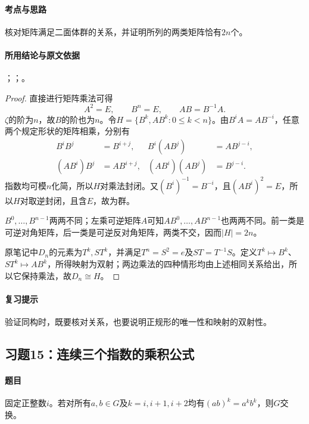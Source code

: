 \paragraph{考点与思路}
核对矩阵满足二面体群的关系，并证明所列的两类矩阵恰有$2n$个。

\paragraph{所用结论与原文依据}
；；。


\begin{proof}
直接进行矩阵乘法可得
\[
A^2=E,\qquad B^n=E,\qquad AB=B^{-1}A.
\]
$\zeta$的阶为$n$，故$B$的阶也为$n$。令$H=\{B^k,AB^k:0\leq k<n\}$。由$B^iA=AB^{-i}$，任意两个规定形状的矩阵相乘，分别有
\begin{align*}
B^iB^j&=B^{i+j},& B^i(AB^j)&=AB^{j-i},\\
(AB^i)B^j&=AB^{i+j},&(AB^i)(AB^j)&=B^{j-i}.
\end{align*}
指数均可模$n$化简，所以$H$对乘法封闭。又$(B^i)^{-1}=B^{-i}$，且$(AB^i)^2=E$，所以$H$对取逆封闭，且含$E$，故为群。

$B^0,\ldots,B^{n-1}$两两不同；左乘可逆矩阵$A$可知$AB^0,\ldots,AB^{n-1}$也两两不同。前一类是可逆对角矩阵，后一类是可逆反对角矩阵，两类不交，因而$|H|=2n$。

原笔记中$D_n$的元素为$T^k,ST^k$，并满足$T^n=S^2=e$及$ST=T^{-1}S$。定义$T^k\mapsto B^k$、$ST^k\mapsto AB^k$，所得映射为双射；两边乘法的四种情形均由上述相同关系给出，所以它保持乘法，故$D_n\cong H$。
\end{proof}

\paragraph{复习提示}
验证同构时，既要核对关系，也要说明正规形的唯一性和映射的双射性。


\subsection{习题15：\texorpdfstring{连续三个指数的乘积公式}{连续三个指数的乘积公式}}
\label{ex:1:15}

\paragraph{题目}
固定正整数$i$。若对所有$a,b\in G$及$k=i,i+1,i+2$均有$(ab)^k=a^kb^k$，则$G$交换。

